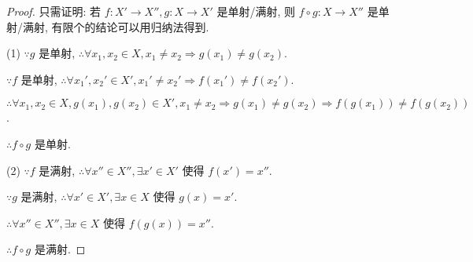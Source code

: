 \documentclass{ctexart}
\begin{document}
\begin{proof}
    只需证明: 若 $f:X'\to X'',g:X\to X'$ 是单射/满射, 则 $f\circ g:X\to X''$ 是单射/满射, 有限个的结论可以用归纳法得到.

    (1) $\because g$ 是单射, $\therefore\forall x_1,x_2\in X,x_1\neq x_2\Rightarrow g(x_1)\neq g(x_2)$.
    
    $\because f$ 是单射, $\therefore\forall x_1',x_2'\in X',x_1'\neq x_2'\Rightarrow f(x_1')\neq f(x_2')$.

    $\therefore\forall x_1,x_2\in X,g(x_1),g(x_2)\in X',x_1\neq x_2\Rightarrow g(x_1)\neq g(x_2)\Rightarrow f(g(x_1))\neq f(g(x_2))$.

    $\therefore f\circ g$ 是单射.

    (2) $\because f$ 是满射, $\therefore\forall x''\in X'',\exists x'\in X'$ 使得 $f(x')=x''$.

    $\because g$ 是满射, $\therefore\forall x'\in X',\exists x\in X$ 使得 $g(x)=x'$.

    $\therefore\forall x''\in X'',\exists x\in X$ 使得 $f(g(x))=x''$.

    $\therefore f\circ g$ 是满射.
\end{proof}
\end{document}
